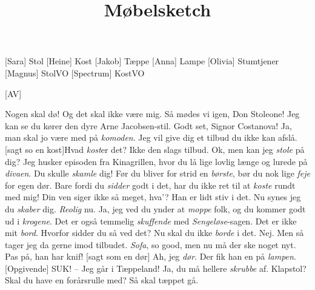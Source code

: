\documentclass[a4paper,11pt]{article}
\title{Møbelsketch}
\begin{document}
\maketitle

\begin{roles}
    [Sara] Stol
    [Heine] Kost
    [Jakob] Tæppe
    [Anna] Lampe
    [Olivia] Stumtjener
    [Magnus] StolVO
    [Spectrum] KostVO
\end{roles}

\begin{props}
    [AV]
\end{props}


\begin{sketch}


 Nogen skal dø! Og det skal ikke være mig. 
 Så mødes vi igen, Don Stoleone! Jeg kan se du kører den dyre Arne Jacobsen-stil.
 Godt set, Signor Costanova! Ja, man skal jo være med på \emph{komoden}. Jeg vil give dig et tilbud du ikke kan afslå.
[sagt so en kost]Hvad \emph{kost}er det?
Ikke den slags tilbud.
Ok, men kan jeg \emph{stole} på dig? Jeg husker episoden fra Kinagrillen, hvor du lå lige lovlig længe og lurede på \emph{divaen}. Du skulle \emph{skamle }dig!
Før du bliver for strid en \emph{børste}, bør du nok lige \emph{feje} for egen dør.
Bare fordi du \emph{sidder} godt i det, har du ikke ret til at \emph{koste} rundt med mig!
Din ven siger ikke så meget, hva’? Han er lidt stiv i det.
Nu synes jeg du \emph{skaber} dig.
\emph{Reolig} nu. Ja, jeg ved du ynder at \emph{moppe} folk, og du kommer godt ud i \emph{krogene}.
Det er også temmelig \emph{skuffende} med \emph{Sengeløse}-sagen.
Det er ikke mit \emph{bord}.
Hvorfor sidder du så ved det?
Nu skal du ikke \emph{borde} i det.
Nej. Men så tager jeg da gerne imod tilbudet.
\emph{Sofa}, so good, men nu må der ske noget nyt.
Pas på, han har knif!
[sagt som en dør] Ah, jeg \emph{dør}.
Der fik han en på \emph{lampen}.
[Opgivende] SUK! -- Jeg går i Tæppeland!
Ja, du må hellere \emph{skrubbe} af.
Klapstol?
Skal du have en forårsrulle med? 
Så skal tæppet gå.


\end{sketch}
\end{document}
